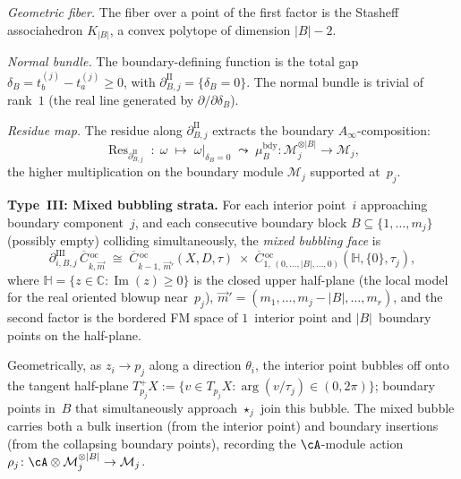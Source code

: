 \begin{proposition}
\emph{Geometric fiber.}
The fiber over a point of the first factor is the Stasheff
associahedron $K_{|B|}$, a convex polytope of dimension
$|B| - 2$.

\emph{Normal bundle.}
The boundary-defining function is the total gap
$\delta_B = t_b^{(j)} - t_a^{(j)} \geq 0$, with
$\partial_{B,j}^{\mathrm{II}} = \{\delta_B = 0\}$.
The normal bundle is trivial of rank~$1$ (the real line
generated by $\partial/\partial\delta_B$).

\emph{Residue map.}
The residue along $\partial_{B,j}^{\mathrm{II}}$ extracts the
boundary $A_\infty$-composition:
\begin{equation}\label{eq:typeII-residue}
\operatorname{Res}_{\partial_{B,j}^{\mathrm{II}}}
\;\colon\;
\omega \;\longmapsto\;
\omega|_{\delta_B = 0}
\;\leadsto\;
\mu_B^{\mathrm{bdy}}
\colon \mathcal{M}_j^{\otimes |B|} \to \mathcal{M}_j,
\end{equation}
the higher multiplication on the boundary module
$\mathcal{M}_j$ supported at~$p_j$.

\medskip
\noindent\textbf{Type~III: Mixed bubbling strata.}
For each interior point~$i$ approaching boundary component~$j$,
and each consecutive boundary block $B \subseteq
\{1, \ldots, m_j\}$ (possibly empty) colliding simultaneously,
the \emph{mixed bubbling face} is
\begin{equation}\label{eq:typeIII-stratum}
\partial_{i,B,j}^{\mathrm{III}}\,
\overline{C}{}^{\,\mathrm{oc}}_{k,\vec{m}}
\;\cong\;
\overline{C}{}^{\,\mathrm{oc}}_{k-1,\, \vec{m}'}(X, D, \tau)
\;\times\;
\overline{C}{}^{\,\mathrm{oc}}_{1,\,
 (0,\ldots,|B|,\ldots,0)}
(\mathbb{H}, \{0\}, \tau_j),
\end{equation}
where $\mathbb{H} = \{z \in \mathbb{C} : \operatorname{Im}(z) \geq 0\}$
is the closed upper half-plane (the local model for the real
oriented blowup near~$p_j$),
$\vec{m}' = (m_1, \ldots, m_j - |B|, \ldots, m_r)$,
and the second factor is the bordered FM space of $1$~interior
point and $|B|$~boundary points on the half-plane.

Geometrically, as $z_i \to p_j$ along a direction $\theta_i$,
the interior point bubbles off onto the tangent half-plane
$T_{p_j}^+ X := \{v \in T_{p_j} X :
\operatorname{arg}(v/\tau_j) \in (0, 2\pi)\}$; boundary points
in~$B$ that simultaneously approach $\star_j$ join this bubble.
The mixed bubble carries both a bulk insertion (from the
interior point) and boundary insertions (from the collapsing
boundary points), recording the $\cA$-module action
$\rho_j \colon \cA \otimes \mathcal{M}_j^{\otimes |B|} \to
\mathcal{M}_j$.


\end{proposition}
